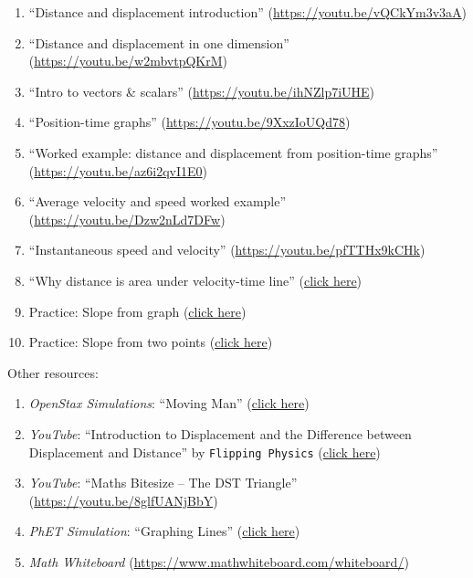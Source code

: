\documentclass[main.tex]{subfiles}
\begin{document}
\begin{enumerate}
\setlength\itemsep{0.1ex}
    \item ``Distance and displacement introduction'' (\href{https://youtu.be/vQCkYm3v3aA}{https://youtu.be/vQCkYm3v3aA})
    \item ``Distance and displacement in one dimension'' (\href{https://youtu.be/w2mbvtpQKrM}{https://youtu.be/w2mbvtpQKrM})
    \item ``Intro to vectors \& scalars'' (\href{https://youtu.be/ihNZlp7iUHE}{https://youtu.be/ihNZlp7iUHE})
    \item ``Position-time graphs'' (\href{https://youtu.be/9XxzIoUQd78}{https://youtu.be/9XxzIoUQd78})
    \item ``Worked example: distance and displacement from position-time graphs'' (\href{https://youtu.be/az6i2qvI1E0}{https://youtu.be/az6i2qvI1E0})
    \item ``Average velocity and speed worked example'' (\href{https://youtu.be/Dzw2nLd7DFw}{https://youtu.be/Dzw2nLd7DFw})
    \item ``Instantaneous speed and velocity'' (\href{https://youtu.be/pfTTHx9kCHk}{https://youtu.be/pfTTHx9kCHk})
    \item ``Why distance is area under velocity-time line'' (\href{https://youtu.be/d-_eqgj5-K8}{click here})
    \item Practice: Slope from graph (\href{https://www.khanacademy.org/math/algebra/x2f8bb11595b61c86:linear-equations-graphs/x2f8bb11595b61c86:slope/e/slope-from-a-graph?modal=1}{click here})
    \item Practice: Slope from two points (\href{https://www.khanacademy.org/math/algebra/x2f8bb11595b61c86:linear-equations-graphs/x2f8bb11595b61c86:slope/e/slope-from-two-points?modal=1}{click here})
\end{enumerate}

Other resources:
\vspace{-1ex}
\begin{enumerate}
\setlength\itemsep{0.1ex}
    \item \textit{OpenStax Simulations}: ``Moving Man'' (\href{https://archive.cnx.org/specials/e2ca52af-8c6b-450e-ac2f-9300b38e8739/moving-man/}{click here})
    \item \textit{YouTube}: ``Introduction to Displacement and the Difference between Displacement and Distance'' by \texttt{Flipping Physics} (\href{https://youtu.be/uTQ4_AOae1g}{click here})
    \item \textit{YouTube}: ``Maths Bitesize -- The DST Triangle'' (\href{https://youtu.be/8glfUANjBbY}{https://youtu.be/8glfUANjBbY})
    \item \textit{PhET Simulation}: ``Graphing Lines'' (\href{https://phet.colorado.edu/sims/html/graphing-lines/latest/graphing-lines_en.html}{click here})
    \item \textit{Math Whiteboard} (\href{https://www.mathwhiteboard.com/whiteboard/}{https://www.mathwhiteboard.com/whiteboard/})
\end{enumerate}
\end{document}
